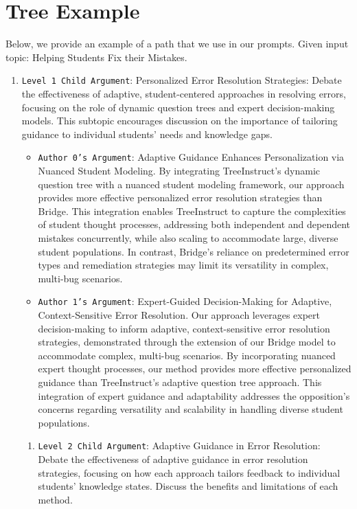 \section{Tree Example}
\label{sec:tree_example}
Below, we provide an example of a path that we use in our prompts. 
Given input topic: Helping Students Fix their Mistakes.
\begin{enumerate}
    \item \texttt{Level 1 Child Argument}: Personalized Error Resolution Strategies: Debate the effectiveness of adaptive, student-centered approaches in resolving errors, focusing on the role of dynamic question trees and expert decision-making models. This subtopic encourages discussion on the importance of tailoring guidance to individual students' needs and knowledge gaps. 
    \begin{itemize}
        \item \texttt{Author 0's Argument}: Adaptive Guidance Enhances Personalization via Nuanced Student Modeling. By integrating TreeInstruct's dynamic question tree with a nuanced student modeling framework, our approach provides more effective personalized error resolution strategies than Bridge. This integration enables TreeInstruct to capture the complexities of student thought processes, addressing both independent and dependent mistakes concurrently, while also scaling to accommodate large, diverse student populations. In contrast, Bridge's reliance on predetermined error types and remediation strategies may limit its versatility in complex, multi-bug scenarios. 
	\item \texttt{Author 1's Argument}: Expert-Guided Decision-Making for Adaptive, Context-Sensitive Error Resolution. Our approach leverages expert decision-making to inform adaptive, context-sensitive error resolution strategies, demonstrated through the extension of our Bridge model to accommodate complex, multi-bug scenarios. By incorporating nuanced expert thought processes, our method provides more effective personalized guidance than TreeInstruct's adaptive question tree approach. This integration of expert guidance and adaptability addresses the opposition's concerns regarding versatility and scalability in handling diverse student populations. 
    \end{itemize}

    \begin{enumerate}
        \item \texttt{Level 2 Child Argument}: Adaptive Guidance in Error Resolution: Debate the effectiveness of adaptive guidance in error resolution strategies, focusing on how each approach tailors feedback to individual students' knowledge states. Discuss the benefits and limitations of each method.


\end{enumerate}
\end{enumerate}
